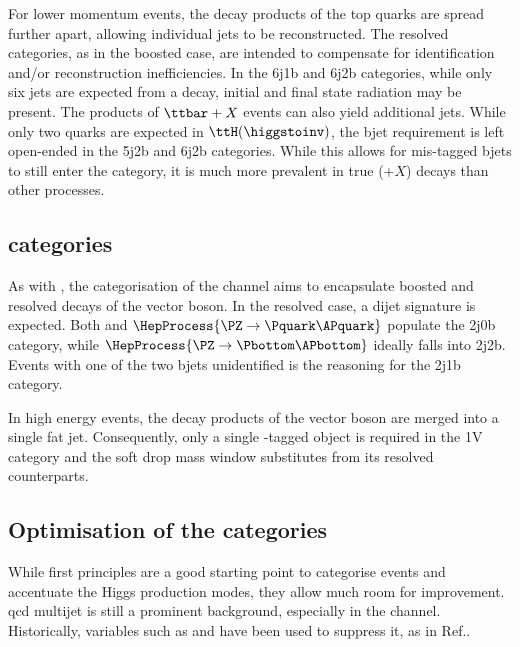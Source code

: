 For lower momentum events, the decay products of the top quarks are spread further apart, allowing individual \glspl{jet} to be reconstructed. The \ttH resolved categories, as in the boosted case, are intended to compensate for identification and/or reconstruction inefficiencies. In the 6j1b and 6j2b categories, while only six \glspl{jet} are expected from a \ttbar decay, initial and final state radiation may be present. The products of $\ttbar + X$ events can also yield additional jets. While only two \Pbottom quarks are expected in $\ttH(\higgstoinv)$, the \gls{bjet} requirement is left open-ended in the 5j2b and 6j2b categories. While this allows for mis-tagged \glspl{bjet} to still enter the category, it is much more prevalent in true \ttbar ($+ X$) decays than other processes.




\subsection{\texorpdfstring{\VH}{VH} categories}
\label{subsec:htoinv_VH_subcats}

As with \ttH, the categorisation of the \VH channel aims to encapsulate boosted and resolved decays of the vector boson. In the resolved case, a dijet signature is expected. Both \PW and $\HepProcess{\PZ \to \Pquark\APquark}$ populate the 2j0b category, while $\HepProcess{\PZ \to \Pbottom\APbottom}$ ideally falls into 2j2b. Events with one of the two \glspl{bjet} unidentified is the reasoning for the 2j1b category.

In high energy events, the decay products of the vector boson are merged into a single fat jet. Consequently, only a single \PVec-tagged object is required in the 1V category and the soft drop mass window substitutes \mjj from its resolved counterparts.




\subsection{Optimisation of the categories}
\label{subsec:htoinv_cat_optimisation}

While first principles are a good starting point to categorise events and accentuate the Higgs production modes, they allow much room for improvement. \acrshort{qcd} multijet is still a prominent background, especially in the \ttH channel. Historically, variables such as \biasedDPhi and \alphat have been used to suppress it, as in Ref..


